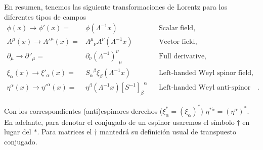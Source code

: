 \begin{frame}
En resumen, tenemos las siguiente transformaciones de Lorentz para los diferentes tipos de campos
\begin{align}
   \phi(x)\to \phi'(x)=&\phi(\Lambda^{-1}x) && \text{Scalar field,}\nonumber\\
   A^\mu(x)\to {A'}^\mu(x)=&{\Lambda^\mu}_\nu A^\nu(\Lambda^{-1}x)&&\text{Vector field,}\nonumber\\
  \partial_{\mu}\to {\partial\,}'_\mu=& \partial_\nu{\left(\Lambda^{-1}\right)^\nu}_\mu &&\text{Full derivative,}\nonumber\\
  \xi_\alpha(x)\to\xi'_\alpha(x)=&{S_\alpha}^\beta\xi_\beta(\Lambda^{-1}x)
                           && \text{Left-handed Weyl spinor field,}\nonumber\\
  \eta^{\alpha}(x)\to {\eta'}^{\alpha}(x) =&\eta^\beta(\Lambda^{-1}x){\left[  S^{-1}  \right]_{\beta}}^{\alpha} && \text{Left-handed  Weyl anti-spinor field}\,.
 \end{align}
\end{frame}
Con los correspondientes (anti)espinores derechos ($\xi_{\dot{\alpha}}^{*}=\left( \xi_\alpha \right)^{*}$) $\eta^{* \dot{\alpha}}=\left( \eta^{\alpha} \right)^{*}$. En adelante, para denotar el conjugado de un espinor usaremos el símbolo $\dagger$ en lugar del $*$. Para matrices el $\dagger$ mantedrá su definición usual de transpuesto conjugado.

